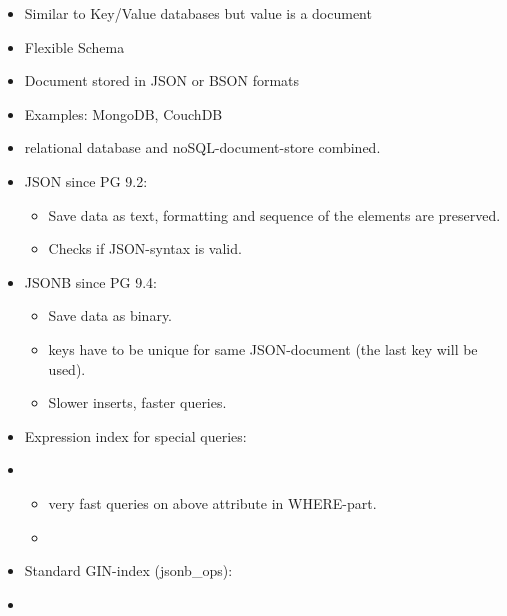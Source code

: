 \begin{breakbox}
\begin{itemize}
	\item Similar to Key/Value databases but value is a document
	\item Flexible Schema
	\item Document stored in JSON or BSON formats
	\item Examples: MongoDB, CouchDB
\end{itemize}
\end{breakbox}

\begin{breakbox}
\begin{itemize}
	\item relational database and noSQL-document-store combined.
	\item JSON since PG 9.2:
		\begin{itemize}
			\item Save data as text, formatting and sequence of the elements are preserved.
			\item Checks if JSON-syntax is valid.
		\end{itemize}
	\item JSONB since PG 9.4:
		\begin{itemize}
			\item Save data as binary.
			\item keys have to be unique for same JSON-document (the last key will be used).
			\item Slower inserts, faster queries.
		\end{itemize}
	\item Expression index for special queries:
\end{itemize}

\begin{itemize}
	\item[]
		\begin{itemize}
			\item very fast queries on above attribute in WHERE-part.
			\item[]
		\end{itemize}
	\item Standard GIN-index (jsonb\_ops):
\end{itemize}

\begin{itemize}
	\item[]

\end{itemize}
\end{breakbox}
